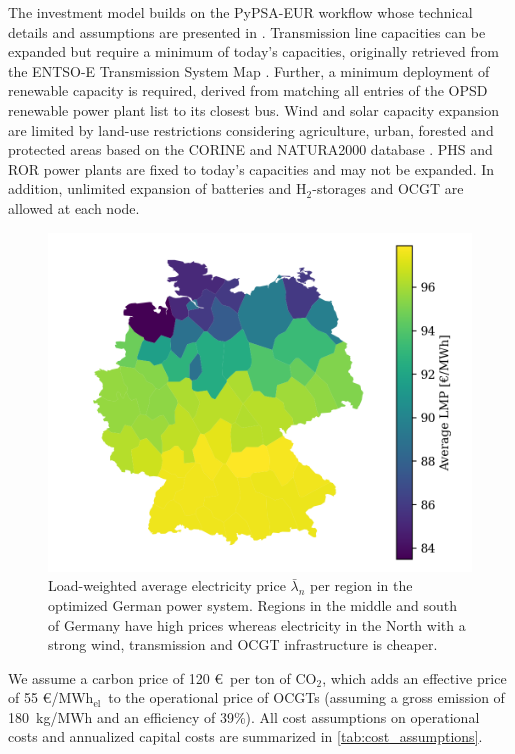 \documentclass[11pt,twocolumn]{article}
\newcommand{\averagelmp}[1][n]{\bar{\lambda}_{#1}}
\newcommand{\megawatthour}{MWh$_\text{el}$}
\begin{document}
The investment model builds on the PyPSA-EUR workflow \cite{horsch_jonas_pypsa-eur_2020} whose technical details and assumptions are presented in \cite{horsch_pypsa-eur_2018}. Transmission line capacities can be expanded but require a minimum of today's capacities, originally retrieved from the ENTSO-E Transmission System Map \cite{entso-e_entso-e_nodate}. Further, a minimum deployment of renewable capacity is required, derived from matching all entries of the OPSD renewable power plant list \cite{schlechtRenewablePowerPlants2020} to its closest bus. Wind and solar capacity expansion are limited by land-use restrictions considering agriculture, urban, forested and protected areas based on the CORINE and NATURA2000 database \cite{eea_corine_2012,eea_natura_2016}. \ac{PHS} and \ac{ROR} power plants are fixed to today's capacities and may not be expanded. In addition, unlimited expansion of batteries and H$_{2}$-storages and \ac{OCGT} are allowed at each node.
% 
% 
\begin{figure}
    \centering
    \includegraphics[width=\linewidth]{de50/average_price}
    \caption{Load-weighted average electricity price $\averagelmp$ per region in the optimized German power system. Regions in the middle and south of Germany have high prices whereas electricity in the North with a strong wind, transmission and \ac{OCGT} infrastructure is cheaper.}
    \label{fig:average_price}
\end{figure}
We assume a carbon price of 120 \euro\, per ton of CO$_{2}$, which adds an effective price of 55 \euro/\megawatthour\, to the operational price of \acp{OCGT} (assuming a gross emission of 180~kg/MWh and an efficiency of 39\%). All cost assumptions on operational costs and annualized capital costs are summarized in \cref{tab:cost_assumptions}.
\end{document}
